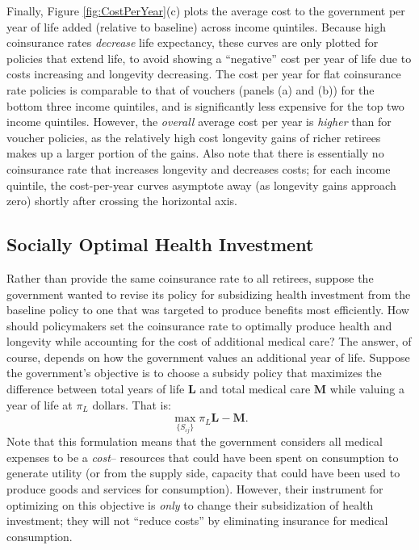 \documentclass[12pt,pdftex,letterpaper]{article}
\newcommand{\Type}{\iota}
\newcommand{\Subsidy}{S}
\newcommand{\Age}{j}
\begin{document}
Finally, Figure \ref{fig:CostPerYear}(c) plots the average cost to the government per year of life added (relative to baseline) across income quintiles.  Because high coinsurance rates \textit{decrease} life expectancy, these curves are only plotted for policies that extend life, to avoid showing a ``negative'' cost per year of life due to costs increasing and longevity decreasing.  The cost per year for flat coinsurance rate policies is comparable to that of vouchers (panels (a) and (b)) for the bottom three income quintiles, and is significantly less expensive for the top two income quintiles.  However, the \textit{overall} average cost per year is \textit{higher} than for voucher policies, as the relatively high cost longevity gains of richer retirees makes up a larger portion of the gains.  Also note that there is essentially no coinsurance rate that increases longevity and decreases costs; for each income quintile, the cost-per-year curves asymptote away (as longevity gains approach zero) shortly after crossing the horizontal axis.


\subsection{Socially Optimal Health Investment}
\label{sec:SocOpt}

Rather than provide the same coinsurance rate to all retirees, suppose the government wanted to revise its policy for subsidizing health investment from the baseline policy to one that was targeted to produce benefits most efficiently.  How should policymakers set the coinsurance rate to optimally produce health and longevity while accounting for the cost of additional medical care?  The answer, of course, depends on how the government values an additional year of life.  Suppose the government's objective is to choose a subsidy policy that maximizes the difference between total years of life $\textbf{L}$ and total medical care $\textbf{M}$ while valuing a year of life at $\pi_L$ dollars.  That is:
\begin{equation}\label{GovtProblem}
\max_{\{\Subsidy_{\Type \Age} \}} \pi_L \textbf{L} - \textbf{M}.
\end{equation}
Note that this formulation means that the government considers all medical expenses to be a \textit{cost}-- resources that could have been spent on consumption to generate utility (or from the supply side, capacity that could have been used to produce goods and services for consumption).  However, their instrument for optimizing on this objective is \textit{only} to change their subsidization of health investment; they will not ``reduce costs'' by eliminating insurance for medical consumption.
\end{document}
